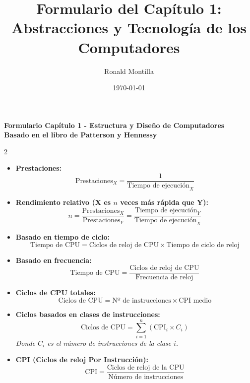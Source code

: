 \documentclass[11pt, a4paper]{article}
\title{\textbf{Formulario del Capítulo 1: Abstracciones y Tecnología de los Computadores}}
\author{Ronald Montilla}
\date{\today}
\begin{document}
{\centering \Large \textbf{Formulario Capítulo 1 - Estructura y Diseño de Computadores} \\[0.2cm]}
{\centering \normalsize \textbf{Basado en el libro de Patterson y Hennessy} \\ \vspace{0.4cm}}

    \begin{multicols*}{2}

        \begin{tcolorbox}[
        colback=white, 
        colframe=blue!40!black, 
        title= {\centering \textbf{Prestaciones y Tiempo de Ejecución} },
        fonttitle=\bfseries,
        size=small
        ]
        \begin{itemize}
            \item \textbf{Prestaciones:}
            $$\text{Prestaciones}_X = \frac{1}{\text{Tiempo de ejecución}_X}$$
            \item \textbf{Rendimiento relativo (X es $n$ veces más rápida que Y):}
            $$n = \frac{\text{Prestaciones}_X}{\text{Prestaciones}_Y} = \frac{\text{Tiempo de ejecución}_Y}{\text{Tiempo de ejecución}_X}$$
        \end{itemize}
        \end{tcolorbox}

        \begin{tcolorbox}[
        colback=white, 
        colframe=blue!40!black, 
        title= {\centering \textbf{Tiempo de CPU} },
        fonttitle=\bfseries,
        size=small
        ]
        \begin{itemize}
            \item \textbf{Basado en tiempo de ciclo:}
            $$\text{Tiempo de CPU} = \text{Ciclos de reloj de CPU} \times \text{Tiempo de ciclo de reloj}$$
            \item \textbf{Basado en frecuencia:}
            $$\text{Tiempo de CPU} = \frac{\text{Ciclos de reloj de CPU}}{\text{Frecuencia de reloj}}$$
        \end{itemize}
        \end{tcolorbox}

        \begin{tcolorbox}[
        colback=white, 
        colframe=blue!40!black, 
        title= {\centering \textbf{Ciclos de Reloj e Instrucciones (CPI)} },
        fonttitle=\bfseries,
        size=small
        ]
        \begin{itemize}
            \item \textbf{Ciclos de CPU totales:}
            $$\text{Ciclos de CPU} = \text{Nº de instrucciones} \times \text{CPI medio}$$
            \item \textbf{Ciclos basados en clases de instrucciones:}
            $$\text{Ciclos de CPU} = \sum_{i=1}^{n} (\text{CPI}_i \times C_i)$$
            \textit{Donde $C_i$ es el número de instrucciones de la clase $i$.}
            \item \textbf{CPI (Ciclos de reloj Por Instrucción):}
            $$\text{CPI} = \frac{\text{Ciclos de reloj de la CPU}}{\text{Número de instrucciones}}$$
        \end{itemize}
        \end{tcolorbox}


\end{multicols*}
\end{document}
